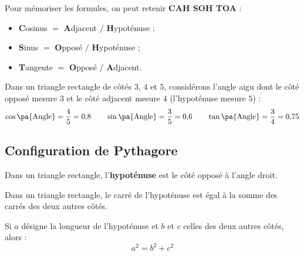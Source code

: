 \begin{center}
\end{center}

\begin{rem}
	Pour mémoriser les formules, on peut retenir \textbf{CAH SOH TOA} :

	\begin{itemize}
		\item \textbf{C}osinus $=$ \textbf{A}djacent $/$ \textbf{H}ypoténuse ;
		\item \textbf{S}inus $=$ \textbf{O}pposé $/$ \textbf{H}ypoténuse ;
		\item \textbf{T}angente $=$ \textbf{O}pposé $/$ \textbf{A}djacent.
	\end{itemize}
\end{rem}

\begin{ex}
	Dans un triangle rectangle de côtés $3$, $4$ et $5$, considérons l'angle aigu dont le côté opposé mesure $3$ et le côté adjacent mesure $4$ (l'hypoténuse mesure $5$) :
	\[
		\cos\pa{\text{Angle}} = \dfrac{4}{5} = 0{,}8 \qquad \sin\pa{\text{Angle}} = \dfrac{3}{5} = 0{,}6 \qquad \tan\pa{\text{Angle}} = \dfrac{3}{4} = 0{,}75
	\]
\end{ex}

\subsection{Configuration de Pythagore}

\begin{defin}
	Dans un triangle rectangle, l'\textbf{hypoténuse} est le côté opposé à l'angle droit.
\end{defin}

\begin{prop}
	Dans un triangle rectangle, le carré de l'hypoténuse est égal à la somme des carrés des deux autres côtés.

	Si $a$ désigne la longueur de l'hypoténuse et $b$ et $c$ celles des deux autres côtés, alors :
	\[
		a^2 = b^2 + c^2
	\]
\end{prop}

